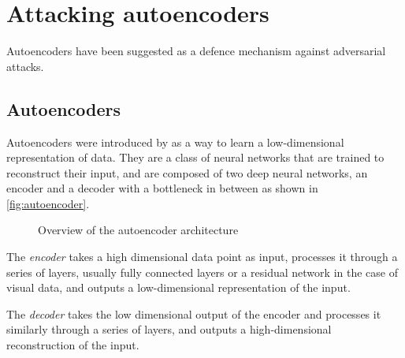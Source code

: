 \documentclass[]{scrarticle}
\renewcommand{\todo}[1]{}
\begin{document}
\clearpage

\section{Attacking autoencoders}

Autoencoders have been suggested as a defence mechanism against adversarial attacks.
\todo{add citation}

\subsection{Autoencoders}

Autoencoders were introduced by \cite{hinton2006reducing} as a way to learn
a low-dimensional representation of data.
They are a class of neural networks that are trained to reconstruct their input,
and are composed of two deep neural networks, an encoder and a decoder with a bottleneck in between
as shown in \autoref{fig:autoencoder}.

\begin{figure}[h]
  \centering
  \caption{Overview of the autoencoder architecture}
  \label{fig:autoencoder}
\end{figure}

The \emph{encoder} takes a high dimensional data point as input,
processes it through a series of layers, usually fully connected layers
or a residual network \cite{He2015DeepRL} in the case of visual data,
and outputs a low-dimensional representation of the input.

The \emph{decoder} takes the low dimensional output of the encoder and
processes it similarly through a series of layers,
and outputs a high-dimensional reconstruction of the input.
\end{document}
